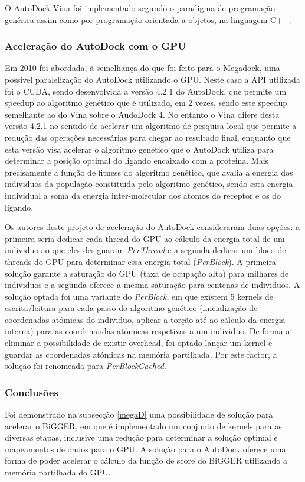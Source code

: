 O AutoDock Vina foi implementado segundo o paradigma de programação genérica assim como por programação orientada a objetos, na linguagem C++. 
\subsubsection{Aceleração do AutoDock com o GPU}
 Em 2010 foi abordada, à semelhança do que foi feito para o Megadock, uma possivel paralelização do AutoDock utilizando o GPU. Neste caso a API utilizada foi o CUDA, sendo desenvolvida a versão 4.2.1 do AutoDock, que permite um speedup ao algoritmo genético que é utilizado, em 2 vezes, sendo este speedup semelhante ao do Vina sobre o AudoDock 4.  No entanto o Vina difere desta versão 4.2.1 no sentido de acelerar um algoritmo de pesquisa local que permite a redução das operações necessárias para chegar ao resultado final, enquanto que esta versão visa acelerar o algoritmo genético que o AutoDock utiliza para determinar a posição optimal do ligando encaixado com a proteina. Mais precisamente a função de fitness do algoritmo genético, que avalia a energia dos individuos da população constituida pelo algoritmo genético, sendo esta energia individual a soma da energia inter-molecular dos atomos do receptor e os do ligando.

Os autores deste projeto de aceleração do AutoDock consideraram duas opções: a primeira seria dedicar cada thread do GPU ao cálculo da energia total de um individuo ao que eles designaram  \textit{PerThread} e a segunda dedicar um bloco de threads do GPU para determinar essa energia total (\textit{PerBlock}). A primeira solução garante a saturação do GPU (taxa de ocupação alta) para milhares de individuos e a segunda oferece a mesma saturação para centenas de individuos.
A solução optada foi uma variante do \textit{PerBlock}, em que existem 5 kernels de escrita/leitura para cada passo do algoritmo genético (inicialização de coordenadas atómicas do individuo, aplicar a torção até ao cálculo da energia interna) para as coordenandas atómicas respetivas a um individuo. De forma a eliminar a possibilidade de existir overhead, foi optado lançar um kernel e guardar as coordenadas atómicas na memória partilhada. Por este factor, a solução foi renomeada para \textit{PerBlockCached}.
 \subsubsection{Conclusões}
 Foi demonstrado na subsecção \ref{megaD} uma possibilidade de solução para acelerar o BiGGER, em que é implementado um conjunto de kernels para as diversas etapas, inclusive uma redução para determinar a solução optimal e mapeamentos de dados para o GPU. A solução para o AutoDock oferece uma forma de poder acelerar o cálculo da função de score do BiGGER utilizando a memória partilhada do GPU. %
 
